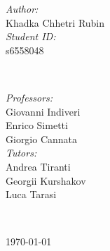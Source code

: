 \begin{titlepage}

\begin{minipage}{0.4\textwidth}
\begin{flushleft} \large
\emph{Author:}\\[0.2cm]
Khadka Chhetri Rubin %
\\[1.2em]
\emph{Student ID:}\\[0.2cm]
s6558048 \\[1.2em]
\end{flushleft}
\end{minipage}
~
\begin{minipage}{0.4\textwidth}
\begin{flushright} \large
\emph{Professors:} \\[0.2cm]
Giovanni Indiveri\\
Enrico Simetti\\
Giorgio Cannata  \\[1.2em] %

\emph{Tutors:} \\[0.2cm]
Andrea Tiranti\\
Georgii Kurshakov\\
Luca Tarasi
\end{flushright}
\end{minipage}\\[2cm]
\makeatother



{\large \today}\\[2cm] %

\vfill %

\end{titlepage}